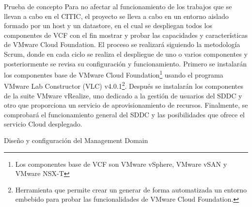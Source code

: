 \begin{section}{Prueba de concepto}
    \label{subsect:prueba-concepto}
Para no afectar al funcionamiento de los trabajos que se llevan a cabo en el CITIC, el proyecto se lleva a cabo en un entorno aislado formado por un host y un datastore, en el cual se despliegan todos los componentes de VCF con el fin mostrar y probar las capacidades y características de VMware Cloud Foundation. 
El proceso se realizará siguiendo la metodología Scrum, donde en cada ciclo se realiza el despliegue de uno o varios componentes y posteriormente se revisa su configuración y funcionamiento. Primero se instalarán los componentes base de VMware Cloud Foundation\footnote{Los componentes base de VCF son VMware vSphere, VMware vSAN y VMware NSX-T} usando el programa VMware Lab Constructor (VLC) v4.0.1\footnote{Herramienta que permite crear un generar de forma automatizada un entorno embebido para probar las funcionalidades de VMware Cloud Foundation.}. Después se instalarán los componentes de la suite VMware vRealize, uno dedicado a la gestión de usuarios del SDDC y otro que proporciona un servicio de aprovisionamiento de recursos. Finalmente, se comprobará el funcionamiento general del SDDC y las posibilidades que ofrece el servicio Cloud desplegado.



\begin{subsection}{Diseño y configuración del Management Domain}


\end{subsection}


\end{section}